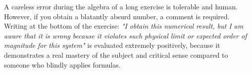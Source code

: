 A careless error during the algebra of a long exercise is tolerable and human. However, if you obtain a blatantly absurd number, a comment is required. Writing at the bottom of the exercise: \textit{"I obtain this numerical result, but I am aware that it is wrong because it violates such physical limit or expected order of magnitude for this system"} is evaluated extremely positively, because it demonstrates a real mastery of the subject and critical sense compared to someone who blindly applies formulas.

